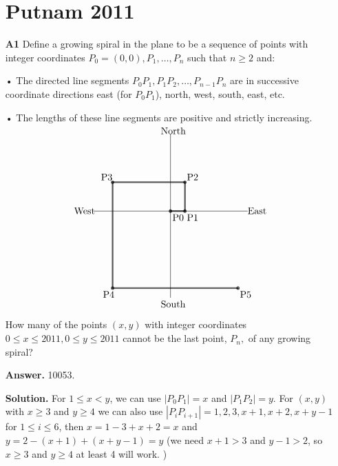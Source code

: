 \documentclass[11pt,a4paper]{article}
\newcommand{\<}{\langle}
\renewcommand{\>}{\rangle}
\begin{document}
\begin{enumerate}
	\section{Putnam 2011}
	\item[\textbf{A1}] Define a growing spiral in the plane to be a sequence of points with integer coordinates $P_0=(0,0),P_1,\dots,P_n$ such that $n\ge 2$ and:
	
	• The directed line segments $P_0P_1,P_1P_2,\dots,P_{n-1}P_n$ are in successive coordinate directions east (for $P_0P_1$), north, west, south, east, etc.
	
	• The lengths of these line segments are positive and strictly increasing.
	
	\[\begin{picture}(200,180)
	
	\put(20,100){\line(1,0){160}}
	\put(100,10){\line(0,1){170}}
	
	\put(0,97){West}
	\put(180,97){East}
	\put(90,0){South}
	\put(90,180){North}
	
	\put(100,100){\circle{1}}\put(100,100){\circle{2}}\put(100,100){\circle{3}}
	\put(115,100){\circle{1}}\put(115,100){\circle{2}}\put(115,100){\circle{3}}
	\put(115,130){\circle{1}}\put(115,130){\circle{2}}\put(115,130){\circle{3}}
	\put(40,130){\circle{1}}\put(40,130){\circle{2}}\put(40,130){\circle{3}}
	\put(40,20){\circle{1}}\put(40,20){\circle{2}}\put(40,20){\circle{3}}
	\put(170,20){\circle{1}}\put(170,20){\circle{2}}\put(170,20){\circle{3}}
	
	\multiput(100,99.5)(0,.5){3}{\line(1,0){15}}
	\multiput(114.5,100)(.5,0){3}{\line(0,1){30}}
	\multiput(40,129.5)(0,.5){3}{\line(1,0){75}}
	\multiput(39.5,20)(.5,0){3}{\line(0,1){110}}
	\multiput(40,19.5)(0,.5){3}{\line(1,0){130}}
	
	\put(102,90){P0}
	\put(117,90){P1}
	\put(117,132){P2}
	\put(28,132){P3}
	\put(30,10){P4}
	\put(172,10){P5}
	
	\end{picture}\]
	
	
	How many of the points $(x,y)$ with integer coordinates $0\le x\le 2011,0\le y\le 2011$ cannot be the last point, $P_n,$ of any growing spiral?
	
	\textbf{Answer.} 10053. 
	
	\textbf{Solution.} For $1\le x< y$, we can use $|P_0P_1|=x$ and $|P_1P_2|=y$. For $(x, y)$ with $x\ge 3$ and $y\ge 4$ we can also use $|P_iP_{i+1}|=1, 2, 3, x+1, x+2, x+y-1$ for $1\le i\le 6$, then $x=1-3+x+2=x$ and $y=2-(x+1)+(x+y-1)=y$ (we need $x+1>3$ and $y-1>2$, so $x\ge 3$ and $y\ge 4$ at least 4 will work. )
	

\end{enumerate}
\end{document}
